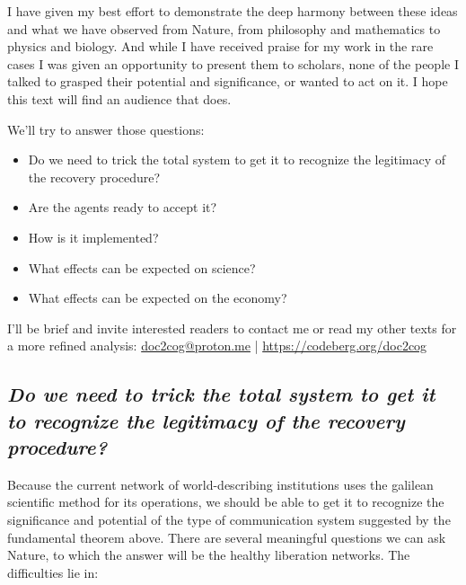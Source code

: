 \documentclass[11pt]{article}
\begin{document}
I have given my best effort to demonstrate the deep harmony between these ideas and what
we have observed from Nature, from philosophy and mathematics to physics and biology.
And while I have received praise for my work in the rare cases I was given an
opportunity to present them to scholars, none of the people I talked to grasped their
potential and significance, or wanted to act on it. I hope this text will find an
audience that does.

We'll try to answer those questions:

\begin{itemize}

\item Do we need to trick the total system to get it to recognize the legitimacy of the
recovery procedure?

\item Are the agents ready to accept it?

\item How is it implemented?

\item What effects can be expected on science?

\item What effects can be expected on the economy?

\end{itemize}

I'll be brief and invite interested readers to contact me or read my other texts for a
more refined analysis: \href{mailto:doc2cog@proton.me}{doc2cog@proton.me} |
\url{https://codeberg.org/doc2cog}

\subsection*{\emph{Do we need to trick the total system to get it to recognize the legitimacy of the recovery procedure?}}

Because the current network of world-describing institutions uses the galilean
scientific method for its operations, we should be able to get it to recognize the
significance and potential of the type of communication system suggested by the
fundamental theorem above. There are several meaningful questions we can ask Nature, to
which the answer will be the healthy liberation networks. The difficulties lie in:
\end{document}

